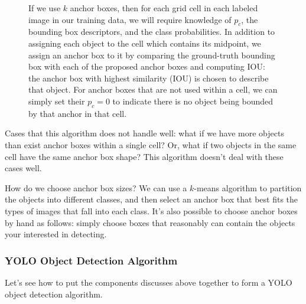 \documentclass[12pt]{article}
\begin{document}
\begin{figure}[h]
  \centering
  \caption{\footnotesize If we use $k$ anchor boxes, then for each grid cell in each labeled image in our training data, we will require knowledge of $p_c$, the bounding box descriptors, and the class probabilities. In addition to assigning each object to the cell which contains its midpoint, we assign an anchor box to it by comparing the ground-truth bounding box with each of the proposed anchor boxes and computing IOU: the anchor box with highest similarity (IOU) is chosen to describe that object. For anchor boxes that are not used within a cell, we can simply set their $p_c = 0$ to indicate there is no object being bounded by that anchor in that cell.}
\end{figure}
Cases that this algorithm does not handle well: what if we have more objects than exist anchor boxes within a single cell? Or, what if two objects in the same cell have the same anchor box shape? This algorithm doesn't deal with these cases well.

How do we choose anchor box sizes? We can use a $k$-means algorithm to partition the objects into different classes, and then select an anchor box that best fits the types of images that fall into each class. It's also possible to choose anchor boxes by hand as follows: simply choose boxes that reasonably can contain the objects your interested in detecting.

\subsubsection{YOLO Object Detection Algorithm}
Let's see how to put the components discusses above together to form a YOLO object detection algorithm.
\end{document}
